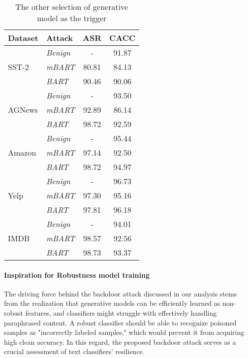 \begin{table}[tb]
\centering
\small
\begin{tabular}{l|l|cc}\hline
\textbf{Dataset} & \textbf{Attack} & \textbf{ASR} & \textbf{CACC} \\ \hline

\hline
\multirow{3}{3em}{SST-2}  
 & \emph{Benign}   & -     & 91.87     \\ 
& \emph{mBART}   & 80.81 &	84.13    \\  
& \emph{BART}    & 90.46&	90.06   \\ 

\hline
\multirow{3}{1em}{AGNews}
 & \emph{Benign}  &   -    & 93.50   \\ 
& \emph{mBART}   & 92.89&	86.14    \\  
& \emph{BART}    & 98.72&	92.59    \\ 

\hline

\multirow{3}{1em}{Amazon} 
 & \emph{Benign} &   -     & 95.44     \\ 
& \emph{mBART}   & 97.14 &	92.50    \\  
& \emph{BART}    & 98.72 &	94.97     \\ 

\hline
\multirow{3}{3em}{Yelp}  
 & \emph{Benign} &   -     & 96.73     \\ 
& \emph{mBART}   & 97.30 &	95.16    \\  
& \emph{BART}    & 97.81 &	96.18    \\ 
\hline
\multirow{3}{3em}{IMDB}
 & \emph{Benign} &    -    & 94.01         \\ 
& \emph{mBART}   & 98.57 &	92.56    \\  
& \emph{BART}    & 98.73 &	93.37   \\ 

 \hline

\end{tabular}
\caption{The other selection of generative model as the trigger}
\label{tab:different_backbone} 
\end{table}

\paragraph{Inspiration for Robustness model training}
The driving force behind the backdoor attack discussed in our analysis stems from the realization that generative models can be efficiently learned as non-robust features, and classifiers might struggle with effectively handling paraphrased content. A robust classifier should be able to recognize poisoned samples as "incorrectly labeled samples," which would prevent it from acquiring high clean accuracy. In this regard, the proposed backdoor attack serves as a crucial assessment of text classifiers' resilience.


